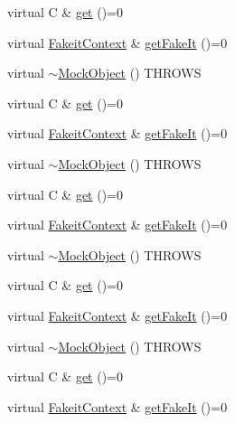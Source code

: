 \begin{DoxyCompactItemize}
\item 
virtual C \& \mbox{\hyperlink{structfakeit_1_1MockObject_a0212799b76097b93a51993cb3af0894a}{get}} ()=0
\item 
virtual \mbox{\hyperlink{structfakeit_1_1FakeitContext}{Fakeit\+Context}} \& \mbox{\hyperlink{structfakeit_1_1MockObject_a26a2fa3fff133e8cb848b0757f58c6b6}{get\+Fake\+It}} ()=0
\item 
virtual \mbox{\hyperlink{structfakeit_1_1MockObject_aba533bcf929bb012934089f767e9863c}{$\sim$\+Mock\+Object}} () T\+H\+R\+O\+WS
\item 
virtual C \& \mbox{\hyperlink{structfakeit_1_1MockObject_a0212799b76097b93a51993cb3af0894a}{get}} ()=0
\item 
virtual \mbox{\hyperlink{structfakeit_1_1FakeitContext}{Fakeit\+Context}} \& \mbox{\hyperlink{structfakeit_1_1MockObject_a26a2fa3fff133e8cb848b0757f58c6b6}{get\+Fake\+It}} ()=0
\item 
virtual \mbox{\hyperlink{structfakeit_1_1MockObject_aba533bcf929bb012934089f767e9863c}{$\sim$\+Mock\+Object}} () T\+H\+R\+O\+WS
\item 
virtual C \& \mbox{\hyperlink{structfakeit_1_1MockObject_a0212799b76097b93a51993cb3af0894a}{get}} ()=0
\item 
virtual \mbox{\hyperlink{structfakeit_1_1FakeitContext}{Fakeit\+Context}} \& \mbox{\hyperlink{structfakeit_1_1MockObject_a26a2fa3fff133e8cb848b0757f58c6b6}{get\+Fake\+It}} ()=0
\item 
virtual \mbox{\hyperlink{structfakeit_1_1MockObject_aba533bcf929bb012934089f767e9863c}{$\sim$\+Mock\+Object}} () T\+H\+R\+O\+WS
\item 
virtual C \& \mbox{\hyperlink{structfakeit_1_1MockObject_a0212799b76097b93a51993cb3af0894a}{get}} ()=0
\item 
virtual \mbox{\hyperlink{structfakeit_1_1FakeitContext}{Fakeit\+Context}} \& \mbox{\hyperlink{structfakeit_1_1MockObject_a26a2fa3fff133e8cb848b0757f58c6b6}{get\+Fake\+It}} ()=0
\item 
virtual \mbox{\hyperlink{structfakeit_1_1MockObject_aba533bcf929bb012934089f767e9863c}{$\sim$\+Mock\+Object}} () T\+H\+R\+O\+WS
\item 
virtual C \& \mbox{\hyperlink{structfakeit_1_1MockObject_a0212799b76097b93a51993cb3af0894a}{get}} ()=0
\item 
virtual \mbox{\hyperlink{structfakeit_1_1FakeitContext}{Fakeit\+Context}} \& \mbox{\hyperlink{structfakeit_1_1MockObject_a26a2fa3fff133e8cb848b0757f58c6b6}{get\+Fake\+It}} ()=0
\end{DoxyCompactItemize}


